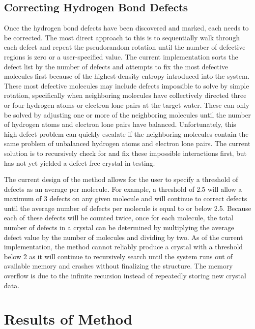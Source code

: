 \subsection{Correcting Hydrogen Bond Defects}

Once the hydrogen bond defects have been discovered and marked, each needs to be corrected.
The most direct approach to this is to sequentially walk through each defect and repeat the pseudorandom rotation until the number of defective regions is zero or a user-specified value.
The current implementation sorts the defect list by the number of defects and attempts to fix the most defective molecules first because of the highest-density entropy introduced into the system.
These most defective molecules may include defects impossible to solve by simple rotation, specifically when neighboring molecules have collectively directed three or four hydrogen atoms or electron lone pairs at the target water. 
These can only be solved by adjusting one or more of the neighboring molecules until the number of hydrogen atoms and electron lone pairs have balanced.
Unfortunately, this high-defect problem can quickly escalate if the neighboring molecules contain the same problem of unbalanced hydrogen atoms and electron lone pairs. 
The current solution is to recursively check for and fix these impossible interactions first, but has not yet yielded a defect-free crystal in testing.

The current design of the method allows for the user to specify a threshold of defects as an average per molecule. 
For example, a threshold of 2.5 will allow a maximum of 3 defects on any given molecule and will continue to correct defects until the average number of defects per molecule is equal to or below 2.5.
Because each of these defects will be counted twice, once for each molecule, the total number of defects in a crystal can be determined by multiplying the average defect value by the number of molecules and dividing by two.
As of the current implementation, the method cannot reliably produce a crystal with a threshold below 2 as it will continue to recursively search until the system runs out of available memory and crashes without finalizing the structure.
The memory overflow is due to the infinite recursion instead of repeatedly storing new crystal data.

\section{Results of Method}

